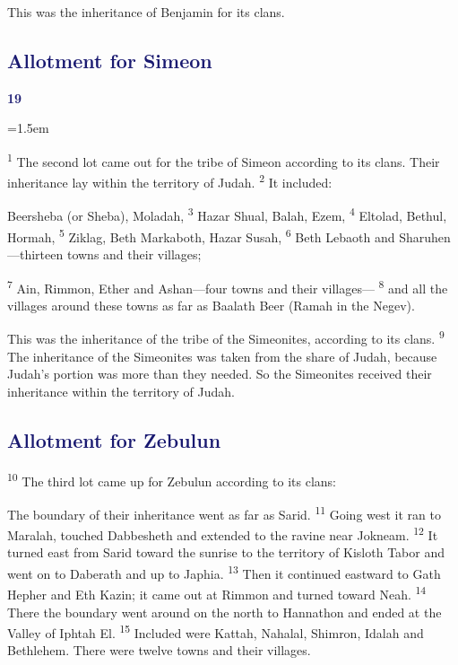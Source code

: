 \documentclass[12pt,twoside]{article}
\newcommand{\vs}[1]{\textsuperscript{#1}}
\newcommand{\chapterWithBigIndent}[2]{%
  \noindent
  \begin{minipage}[t]{1cm}
    \vspace{-0.4\baselineskip}
    {\textcolor{MidnightBlue}{\fontsize{40pt}{48pt}\selectfont \textbf{#1}}}
  \end{minipage}%
  \hspace{0.9cm}%
  \begin{minipage}[t]{\dimexpr\linewidth - 1.5cm - 0.3cm\relax}
    \hangindent=1.5em
    \hangafter=3
    #2
    \vspace{0.05cm}
  \end{minipage}
}
\begin{document}
\noindent This was the inheritance of Benjamin for its clans.

\subsection*{\textcolor{MidnightBlue}{\textbf{Allotment for Simeon}}}

\chapterWithBigIndent{19}{
  \vs{1} The second lot came out for the tribe of Simeon according to its clans. Their inheritance lay within the territory of Judah.
  \vs{2} It included:\vspace{0.3cm}
}
\begin{adjustwidth}{0.5cm}{0cm}
  \hspace{0.5cm}Beersheba (or Sheba), Moladah,
  \vs{3} Hazar Shual, Balah, Ezem,
  \vs{4} Eltolad, Bethul, Hormah,
  \vs{5} Ziklag, Beth Markaboth, Hazar Susah,
  \vs{6} Beth Lebaoth and Sharuhen---thirteen towns and their villages;

  \vs{7} Ain, Rimmon, Ether and Ashan---four towns and their villages---
  \vs{8} and all the villages around these towns as far as Baalath Beer (Ramah in the Negev).
\end{adjustwidth}

\noindent This was the inheritance of the tribe of the Simeonites, according to its clans.
\vs{9} The inheritance of the Simeonites was taken from the share of Judah, because Judah's portion was more than they needed. So the Simeonites received their inheritance within the territory of Judah.

\subsection*{\textcolor{MidnightBlue}{\textbf{Allotment for Zebulun}}}

\vs{10} The third lot came up for Zebulun according to its clans:

\begin{adjustwidth}{0.5cm}{0cm}
  \hspace{0.5cm}The boundary of their inheritance went as far as Sarid.
  \vs{11} Going west it ran to Maralah, touched Dabbesheth and extended to the ravine near Jokneam.
  \vs{12} It turned east from Sarid toward the sunrise to the territory of Kisloth Tabor and went on to Daberath and up to Japhia.
  \vs{13} Then it continued eastward to Gath Hepher and Eth Kazin; it came out at Rimmon and turned toward Neah.
  \vs{14} There the boundary went around on the north to Hannathon and ended at the Valley of Iphtah El.
  \vs{15} Included were Kattah, Nahalal, Shimron, Idalah and Bethlehem. There were twelve towns and their villages.
\end{adjustwidth}
\end{document}
